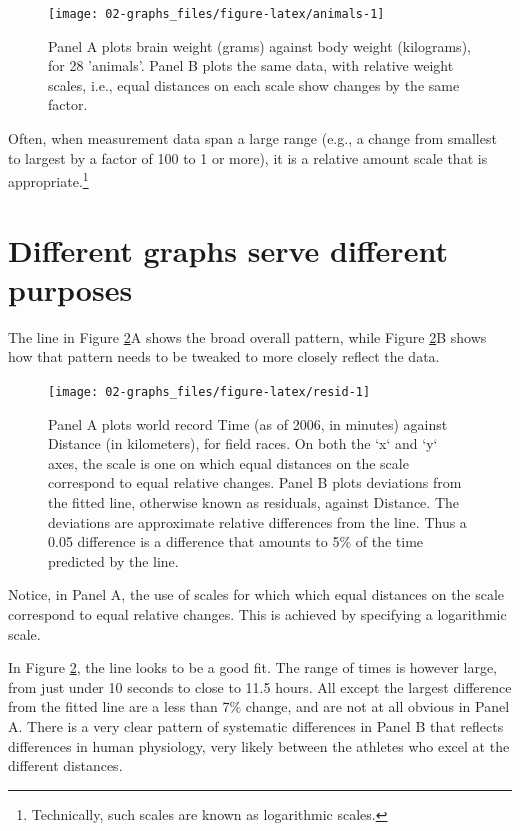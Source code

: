 \documentclass[
  10pt,
  b5paper]{book}
\begin{document}
\begin{figure}[H]

{\centering \texttt{[image: 02-graphs\_files/figure-latex/animals-1]} 

}

\caption{Panel A plots brain weight (grams) against body weight 
(kilograms), for 28 'animals'.  Panel B plots the same data, 
with relative weight scales, i.e., equal distances on each scale 
show changes by the same factor.}\label{fig:animals}
\end{figure}

Often, when measurement data span a large range (e.g., a change
from smallest to largest by a factor of 100 to 1 or more),
it is a relative amount scale that is appropriate.\footnote{Technically,
  such scales are known as logarithmic scales.}

\hypertarget{track}{%
\section{Different graphs serve different purposes}\label{track}}

The line in Figure \ref{fig:resid}A shows the broad overall pattern, while
Figure \ref{fig:resid}B shows how that pattern needs to be tweaked to more
closely reflect the data.

\begin{figure}[H]

{\centering \texttt{[image: 02-graphs\_files/figure-latex/resid-1]} 

}

\caption{Panel A plots world record Time (as of 2006, in minutes) against Distance
(in kilometers), for field races.  On both the `x` and `y` axes, the scale
is one on which equal distances on the scale correspond to equal
relative changes.  Panel B plots deviations from the fitted line, otherwise
known as residuals, against Distance. The deviations are approximate relative
differences from the line.  Thus a 0.05 difference is a difference that amounts
to 5\% of the time predicted by the line.}\label{fig:resid}
\end{figure}

Notice, in Panel A, the use of scales for which which equal distances on
the scale correspond to equal relative changes. This is achieved by
specifying a logarithmic scale.

In Figure \ref{fig:resid}, the line looks to be a good fit. The range
of times is however large, from just under 10 seconds to close to 11.5 hours.
All except the largest difference from the fitted line are a less than 7\%
change, and are not at all obvious in Panel A. There is a very clear pattern
of systematic differences in Panel B that reflects differences in human
physiology, very likely between the athletes who excel at the different
distances.
\end{document}
